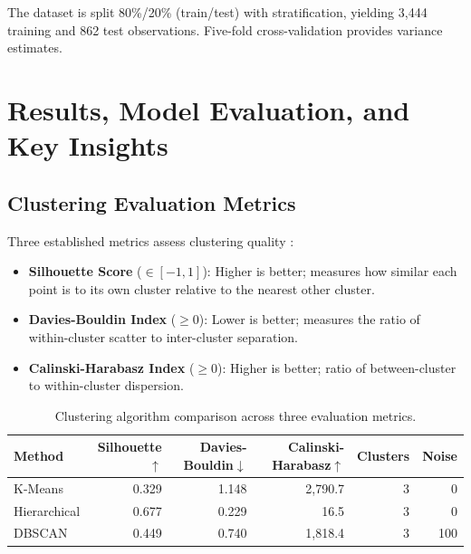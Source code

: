 \documentclass[10pt,a4paper]{article}
\begin{document}
The dataset is split 80\%/20\% (train/test) with stratification, yielding
3,444 training and 862 test observations.  Five-fold cross-validation provides
variance estimates.

\section{Results, Model Evaluation, and Key Insights}

\subsection{Clustering Evaluation Metrics}

Three established metrics assess clustering quality \parencite{rousseeuw1987silhouettes,
davies1979cluster, calinski1974dendrite}:

\begin{itemize}[leftmargin=*]
  \item \textbf{Silhouette Score} ($\in [-1, 1]$): Higher is better; measures how
        similar each point is to its own cluster relative to the nearest other cluster.
  \item \textbf{Davies-Bouldin Index} ($\geq 0$): Lower is better; measures the ratio
        of within-cluster scatter to inter-cluster separation.
  \item \textbf{Calinski-Harabasz Index} ($\geq 0$): Higher is better; ratio of
        between-cluster to within-cluster dispersion.
\end{itemize}

\begin{table}[H]
  \centering
  \caption{Clustering algorithm comparison across three evaluation metrics.}
  \label{tab:cluster_compare}
  \begin{tabular}{lrrrrr}
    \toprule
    \textbf{Method} & \textbf{Silhouette}$\uparrow$ & \textbf{Davies-Bouldin}$\downarrow$
                    & \textbf{Calinski-Harabasz}$\uparrow$ & \textbf{Clusters} & \textbf{Noise} \\
    \midrule
    K-Means       & 0.329 & 1.148 & 2,790.7 & 3 & 0   \\
    Hierarchical  & 0.677 & 0.229 &    16.5 & 3 & 0   \\
    DBSCAN        & 0.449 & 0.740 & 1,818.4 & 3 & 100 \\
    \bottomrule
  \end{tabular}
\end{table}
\end{document}
